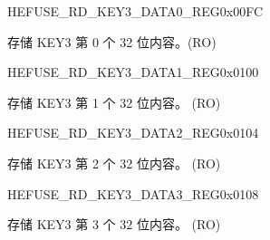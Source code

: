 \begin{register}{H}{EFUSE\_RD\_KEY3\_DATA0\_REG}{0x00FC}\label{regdesc:EFUSERDKEY3DATA0REG}
%
\regnewline%
\begin{regdesc}\begin{reglist}
\label{fielddesc:EFUSEKEY3DATA0}\item [EFUSE\_KEY3\_DATA0] 存储 KEY3 第 0 个 32 位内容。(RO)
\end{reglist}\end{regdesc}
\end{register}


\begin{register}{H}{EFUSE\_RD\_KEY3\_DATA1\_REG}{0x0100}\label{regdesc:EFUSERDKEY3DATA1REG}
%
\regnewline%
\begin{regdesc}\begin{reglist}
\label{fielddesc:EFUSEKEY3DATA1}\item [EFUSE\_KEY3\_DATA1] 存储 KEY3 第 1 个 32 位内容。 (RO)
\end{reglist}\end{regdesc}
\end{register}


\begin{register}{H}{EFUSE\_RD\_KEY3\_DATA2\_REG}{0x0104}\label{regdesc:EFUSERDKEY3DATA2REG}
%
\regnewline%
\begin{regdesc}\begin{reglist}
\label{fielddesc:EFUSEKEY3DATA2}\item [EFUSE\_KEY3\_DATA2] 存储 KEY3 第 2 个 32 位内容。 (RO)
\end{reglist}\end{regdesc}
\end{register}


\begin{register}{H}{EFUSE\_RD\_KEY3\_DATA3\_REG}{0x0108}\label{regdesc:EFUSERDKEY3DATA3REG}
%
\regnewline%
\begin{regdesc}\begin{reglist}
\label{fielddesc:EFUSEKEY3DATA3}\item [EFUSE\_KEY3\_DATA3] 存储 KEY3 第 3 个 32 位内容。 (RO)
\end{reglist}\end{regdesc}
\end{register}


